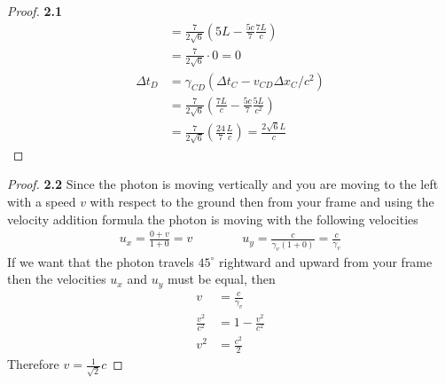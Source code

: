 \documentclass[11pt]{article}
\theoremstyle{definition}
\begin{document}
\begin{proof}{\textbf{2.1}}
\begin{align*}
                &= \frac{7}{2\sqrt{6}}(5L - \frac{5c}{7}\frac{7L}{c}) \\
                &= \frac{7}{2\sqrt{6}} \cdot 0 = 0 \\
            \Delta t_D &= \gamma_{CD} (\Delta t_C - v_{CD}\Delta x_C/c^2)\\
                &= \frac{7}{2\sqrt{6}}(\frac{7L}{c} - \frac{5c}{7}\frac{5L}{c^2}) \\
                &= \frac{7}{2\sqrt{6}}(\frac{24}{7}\frac{L}{c}) = \frac{2\sqrt{6}L}{c}
        \end{align*}
    \end{proof}

\cleardoublepage
    \begin{proof}{\textbf{2.2}}
        Since the photon is moving vertically and you are moving to the left with a speed
        $v$ with respect to the ground then from your frame and using the velocity
        addition formula the photon is moving with the following velocities
        \begin{align*}
            u_x = \frac{0 + v}{1 + 0} = v \quad\quad\quad\quad
            u_y = \frac{c}{\gamma_v(1 + 0)} = \frac{c}{\gamma_{v}}
        \end{align*}
        If we want that the photon travels $45^{\circ}$ rightward and upward from your
        frame then the velocities $u_x$ and $u_y$ must be equal, then
        \begin{align*}
            v &= \frac{c}{\gamma_v}\\
            \frac{v^2}{c^2} &= 1 - \frac{v^2}{c^2}\\
            v^2 &= \frac{c^2}{2}
        \end{align*}
        Therefore $v = \frac{1}{\sqrt{2}}c$
    \end{proof}
\end{document}
